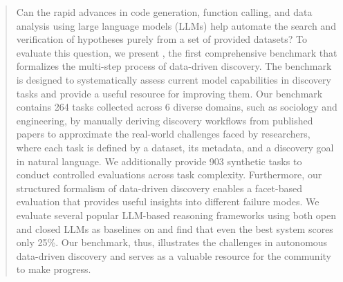 \begin{abstract}

Can the rapid advances in code generation, function calling, and data analysis using large language models (LLMs) help automate the search and verification of hypotheses purely from a set of provided datasets?
To evaluate this question, we present \discoverybench{}, the first comprehensive benchmark that formalizes the multi-step process of data-driven discovery.
The benchmark is designed to systematically assess current model capabilities in discovery tasks and provide a useful resource for improving them.
Our benchmark contains 264 tasks collected across 6 diverse domains, such as sociology and engineering, by manually deriving discovery workflows from published papers
to approximate the real-world challenges faced by researchers, where each task is defined by a dataset, its metadata, and a discovery goal in natural language.
We additionally provide 903 synthetic tasks to conduct controlled evaluations across task complexity.
Furthermore, our structured formalism of data-driven discovery enables a facet-based evaluation that provides useful insights into different failure modes. 
We evaluate several popular LLM-based reasoning frameworks using both open and closed
LLMs as baselines on \discoverybench{} and find that even the best system scores only 25\%. 
Our benchmark, thus, illustrates the challenges in autonomous data-driven discovery and serves as a valuable resource for the community to make progress.
\end{abstract}


